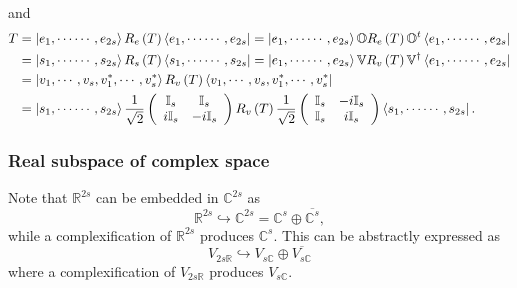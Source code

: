 \documentclass[aps,preprint]{revtex4}%
\begin{document}
and
\begin{align}
T  &  =\left\vert e_{1},\cdots\cdots,e_{2s}\right\rangle R_{e}\left(
T\right)  \left\langle e_{1},\cdots\cdots,e_{2s}\right\vert =\left\vert
e_{1},\cdots\cdots,e_{2s}\right\rangle \mathbb{O}R_{e}\left(  T\right)
\mathbb{O}^{t}\left\langle e_{1},\cdots\cdots,e_{2s}\right\vert \\
&  =\left\vert s_{1},\cdots\cdots,s_{2s}\right\rangle R_{s}\left(  T\right)
\left\langle s_{1},\cdots\cdots,s_{2s}\right\vert =\left\vert e_{1}%
,\cdots\cdots,e_{2s}\right\rangle \mathbb{V}R_{v}\left(  T\right)
\mathbb{V}^{\dagger}\left\langle e_{1},\cdots\cdots,e_{2s}\right\vert \\
&  =\left\vert v_{1},\cdots,v_{s},v_{1}^{\ast},\cdots,v_{s}^{\ast
}\right\rangle R_{v}\left(  T\right)  \left\langle v_{1},\cdots,v_{s}%
,v_{1}^{\ast},\cdots,v_{s}^{\ast}\right\vert \\
&  =\left\vert s_{1},\cdots\cdots,s_{2s}\right\rangle \frac{1}{\sqrt{2}%
}\left(
\begin{array}
[c]{cc}%
\mathbb{I}_{s} & \mathbb{I}_{s}\\
i\mathbb{I}_{s} & -i\mathbb{I}_{s}%
\end{array}
\right)  R_{v}\left(  T\right)  \frac{1}{\sqrt{2}}\left(
\begin{array}
[c]{cc}%
\mathbb{I}_{s} & -i\mathbb{I}_{s}\\
\mathbb{I}_{s} & i\mathbb{I}_{s}%
\end{array}
\right)  \left\langle s_{1},\cdots\cdots,s_{2s}\right\vert .
\end{align}


\subsubsection{Real subspace of complex space}

Note that $\mathbb{R}^{2s}$ can be embedded in $\mathbb{C}^{2s}$ as
\begin{equation}
\mathbb{R}^{2s}\hookrightarrow\mathbb{C}^{2s}=\mathbb{C}^{s}\oplus
\overline{\mathbb{C}^{s}},
\end{equation}
while a complexification of $\mathbb{R}^{2s}$ produces $\mathbb{C}^{s}.$ This
can be abstractly expressed as
\begin{equation}
V_{2s\mathbb{R}}\hookrightarrow V_{s\mathbb{C}}\oplus\overline{V_{s\mathbb{C}%
}}%
\end{equation}
where a complexification of $V_{2s\mathbb{R}}$ produces $V_{s\mathbb{C}}$.
\end{document}
